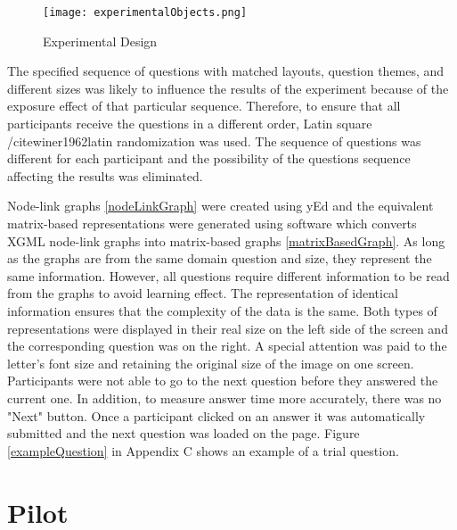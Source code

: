 \documentclass{l4proj}
\begin{document}
\begin{figure}[H]
\centering
\texttt{[image: experimentalObjects.png]}
\caption{Experimental Design}
\label{experimentalDesign}
\end{figure}


The specified sequence of questions with matched layouts, question themes, and different sizes was likely to influence the results of the experiment because of the exposure effect of that particular sequence. Therefore, to ensure that all participants receive the questions in a different order, Latin square /cite{winer1962latin} randomization was used. The sequence of questions was different for each participant and the possibility of the questions sequence affecting the results was eliminated.
  
Node-link graphs \ref{nodeLinkGraph} were created using yEd and the equivalent matrix-based representations were generated using software which converts XGML node-link graphs into matrix-based graphs \ref{matrixBasedGraph}. As long as the graphs are from the same domain question and size, they represent the same information. However, all questions require different information to be read from the graphs to avoid learning effect. The representation of identical information ensures that the complexity of the data is the same. Both types of representations were displayed in their real size on the left side of the screen and the corresponding question was on the right. A special attention was paid to the letter's font size and retaining the original size of the image on one screen. Participants were not able to go to the next question before they answered the current one. In addition, to measure answer time more accurately, there was no "Next" button. Once a participant clicked on an answer it was automatically submitted and the next question was loaded on the page. Figure \ref{exampleQuestion} in Appendix C shows an example of a trial question.

\section{Pilot}
\end{document}
